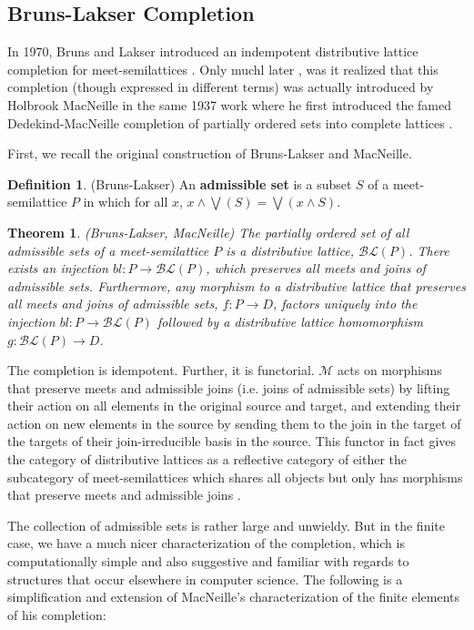\documentclass[hoptionsi,review,format=acmsmall]{acmart}
\newtheorem{theorem}{Theorem}[section]
\theoremstyle{definition}
\newtheorem{definition}{Definition}[section]
\newcommand{\Mcc}{\mathcal{M}}
\newcommand{\BLc}{\mathcal{BL}}
\begin{document}
\subsection{Bruns-Lakser Completion}

In 1970, Bruns and Lakser introduced an indempotent distributive lattice completion for meet-semilattices \cite{bruns1970injective}. Only muchl later \cite{ball2016dedekind}, was it realized that this completion (though expressed in different terms) was actually introduced by  Holbrook MacNeille in the same 1937 work where he first introduced the famed Dedekind-MacNeille completion of partially ordered sets into complete lattices \cite{macneille1937partially}. 

First, we recall the original construction of Bruns-Lakser and MacNeille.

\begin{definition}
(Bruns-Lakser) An \textbf{admissible set} is a subset \(S\) of a meet-semilattice \(P\) in which for all \(x\), \(x \wedge \bigvee(S) = \bigvee(x \wedge S)\).
\end{definition}

\begin{theorem}
(Bruns-Lakser, MacNeille) The partially ordered set of all admissible sets of a meet-semilattice \(P\) is a distributive lattice, \(\BLc(P)\). There exists an injection \(bl : P \rightarrow \BLc(P)\), which preserves all meets and joins of admissible sets. Furthermore, any morphism to a distributive lattice that preserves all meets and joins of admissible sets, \(f : P \rightarrow D\), factors uniquely into the injection \(bl : P \rightarrow \BLc(P)\) followed by a distributive lattice homomorphism \(g : \BLc(P) \rightarrow D\).
\end{theorem}

The completion is idempotent. Further, it is functorial. \(\Mcc\) acts on morphisms that preserve meets and admissible joins (i.e. joins of admissible sets) by lifting their action on all elements in the original source and target, and extending their action on new elements in the source by sending them to the join in the target of the targets of their join-irreducible basis in the source. This functor in fact gives the category of distributive lattices as a reflective category of either the subcategory of meet-semilattices which shares all objects but only has morphisms that preserve meets and admissible joins \cite{gehrke2014distributive}.

The collection of admissible sets is rather large and unwieldy. But in the finite case, we have a much nicer characterization of the completion, which is computationally simple and also suggestive and familiar with regards to structures that occur elsewhere in computer science. The following is a simplification and extension of MacNeille's characterization of the finite elements of his completion:
\end{document}
